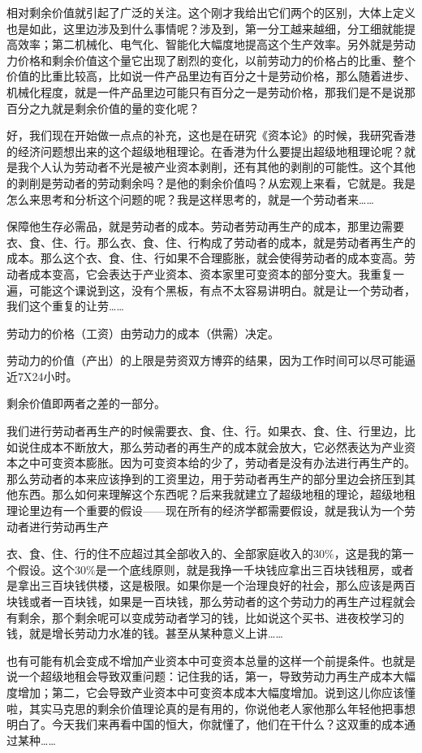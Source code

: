 \documentclass[UTF8, 12pt, a4paper]{ctexrep}
\begin{document}
相对剩余价值就引起了广泛的关注。这个刚才我给出它们两个的区别，大体上定义也是如此，这里边涉及到什么事情呢？涉及到，第一分工越来越细，分工细就能提高效率；第二机械化、电气化、智能化大幅度地提高这个生产效率。另外就是劳动力价格和剩余价值这个量它出现了剧烈的变化，以前劳动力的价格占的比重、整个价值的比重比较高，比如说一件产品里边有百分之十是劳动价格，那么随着进步、机械化程度，就是一件产品里边可能只有百分之一是劳动价格，那我们是不是说那百分之九就是剩余价值的量的变化呢？

好，我们现在开始做一点点的补充，这也是在研究《资本论》的时候，我研究香港的经济问题想出来的这个超级地租理论。在香港为什么要提出超级地租理论呢？就是我个人认为劳动者不光是被产业资本剥削，还有其他的剥削的可能性。这个其他的剥削是劳动者的劳动剩余吗？是他的剩余价值吗？从宏观上来看，它就是。我是怎么来思考和分析这个问题的呢？我是这样思考的，就是一个劳动者来……

保障他生存必需品，就是劳动者的成本。劳动者劳动再生产的成本，那里边需要衣、食、住、行。那么衣、食、住、行构成了劳动者的成本，就是劳动者再生产的成本。那么这个衣、食、住、行如果不合理膨胀，就会使得劳动者的成本变高。劳动者成本变高，它会表达于产业资本、资本家里可变资本的部分变大。我重复一遍，可能这个课说到这，没有个黑板，有点不太容易讲明白。就是让一个劳动者，我们这个重复的让劳……

{\kaishu 劳动力的价格（工资）由劳动力的成本（供需）决定。}

{\kaishu 劳动力的价值（产出）的上限是劳资双方博弈的结果，因为工作时间可以尽可能逼近7X24小时。}

{\kaishu 剩余价值即两者之差的一部分。}

我们进行劳动者再生产的时候需要衣、食、住、行。如果衣、食、住、行里边，比如说住成本不断放大，那么劳动者的再生产的成本就会放大，它必然表达为产业资本之中可变资本膨胀。因为可变资本给的少了，劳动者是没有办法进行再生产的。那么劳动者的本来应该挣到的工资里边，用于劳动者再生产的部分里边会挤压到其他东西。那么如何来理解这个东西呢？后来我就建立了超级地租的理论，超级地租理论里边有一个重要的假设——现在所有的经济学都需要假设，就是我认为一个劳动者进行劳动再生产

衣、食、住、行的住不应超过其全部收入的、全部家庭收入的30\%，这是我的第一个假设。这个30\%是一个底线原则，就是我挣一千块钱应拿出三百块钱租房，或者是拿出三百块钱供楼，这是极限。如果你是一个治理良好的社会，那么应该是两百块钱或者一百块钱，如果是一百块钱，那么劳动者的这个劳动力的再生产过程就会有剩余，那个剩余呢可以变成劳动者学习的钱，比如说这个买书、进夜校学习的钱，就是增长劳动力水准的钱。甚至从某种意义上讲……

也有可能有机会变成不增加产业资本中可变资本总量的这样一个前提条件。也就是说一个超级地租会导致双重问题：记住我的话，第一，导致劳动力再生产成本大幅度增加；第二，它会导致产业资本中可变资本成本大幅度增加。说到这儿你应该懂啦，其实马克思的剩余价值理论真的是有用的，你说他老人家他那么年轻他把事想明白了。今天我们来再看中国的恒大，你就懂了，他们在干什么？这双重的成本通过某种……
\end{document}
